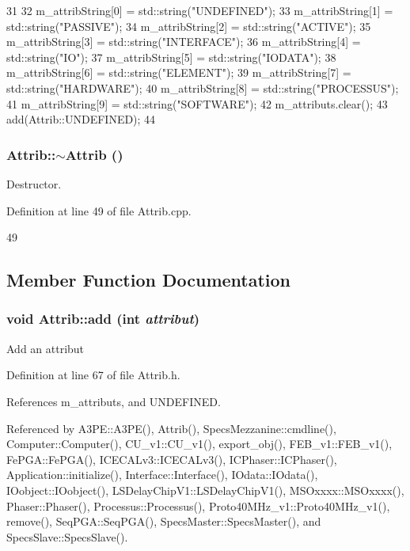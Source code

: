 \begin{DoxyCode}
31                  {
32   m_attribString[0] = std::string("UNDEFINED");
33   m_attribString[1] = std::string("PASSIVE");
34   m_attribString[2] = std::string("ACTIVE");
35   m_attribString[3] = std::string("INTERFACE");
36   m_attribString[4] = std::string("IO");
37   m_attribString[5] = std::string("IODATA");
38   m_attribString[6] = std::string("ELEMENT");
39   m_attribString[7] = std::string("HARDWARE");
40   m_attribString[8] = std::string("PROCESSUS");
41   m_attribString[9] = std::string("SOFTWARE");
42   m_attributs.clear();
43   add(Attrib::UNDEFINED);
44 }
\end{DoxyCode}
\hypertarget{classAttrib_a6f3413862312138b87255c2e12dd8326}{
\subsubsection[{$\sim$Attrib}]{\setlength{\rightskip}{0pt plus 5cm}Attrib::$\sim$Attrib ()}}
\label{classAttrib_a6f3413862312138b87255c2e12dd8326}


Destructor. 

Definition at line 49 of file Attrib.cpp.


\begin{DoxyCode}
49 {} 
\end{DoxyCode}


\subsection{Member Function Documentation}
\hypertarget{classAttrib_a235f773af19c900264a190b00a3b4ad7}{
\subsubsection[{add}]{\setlength{\rightskip}{0pt plus 5cm}void Attrib::add (int {\em attribut})}}
\label{classAttrib_a235f773af19c900264a190b00a3b4ad7}
Add an attribut 

Definition at line 67 of file Attrib.h.

References m\_\-attributs, and UNDEFINED.

Referenced by A3PE::A3PE(), Attrib(), SpecsMezzanine::cmdline(), Computer::Computer(), CU\_\-v1::CU\_\-v1(), export\_\-obj(), FEB\_\-v1::FEB\_\-v1(), FePGA::FePGA(), ICECALv3::ICECALv3(), ICPhaser::ICPhaser(), Application::initialize(), Interface::Interface(), IOdata::IOdata(), IOobject::IOobject(), LSDelayChipV1::LSDelayChipV1(), MSOxxxx::MSOxxxx(), Phaser::Phaser(), Processus::Processus(), Proto40MHz\_\-v1::Proto40MHz\_\-v1(), remove(), SeqPGA::SeqPGA(), SpecsMaster::SpecsMaster(), and SpecsSlave::SpecsSlave().


